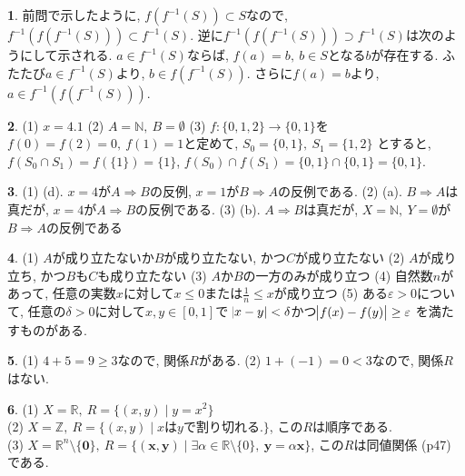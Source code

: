 \documentclass{amsart}
\theoremstyle{definition}
\newtheorem{ans}{}
\numberwithin{ans}{subsection}
\begin{document}
\begin{ans}
  前問で示したように, $f(f^{-1}(S)) \subset S$なので,
  $f^{-1}(f(f^{-1}(S))) \subset f^{-1}(S)$.
  逆に$f^{-1}(f(f^{-1}(S))) \supset f^{-1}(S)$は次のようにして示される.
  $a \in f^{-1}(S)$ならば, $f(a) = b,\ b \in S$となる$b$が存在する.
  ふたたび$a \in f^{-1}(S)$より, $b \in f(f^{-1}(S))$.
  さらに$f(a) = b$より, $a \in f^{-1}(f(f^{-1}(S)))$.
\end{ans}

\begin{ans}
  (1) $x = 4.1$
  (2) $A = \mathbb{N},\ B = \emptyset$
  (3) $f: \{0, 1, 2\} \rightarrow \{0, 1\}$を
  $f(0) = f(2) = 0,\ f(1) = 1$と定めて,
  $S_0 = \{0, 1\},\ S_1 = \{1, 2\}$
  とすると, $f(S_0 \cap S_1) = f(\{1\}) = \{1\}$,
  $f(S_0) \cap f(S_1) = \{0, 1\} \cap \{0, 1\} = \{0, 1\}$.
\end{ans}

\begin{ans}
  (1) (d).
  $x = 4$が$A \Rightarrow B$の反例,
  $x = 1$が$B \Rightarrow A$の反例である.
  (2) (a).
  $B \Rightarrow A$は真だが,
  $x = 4$が$A \Rightarrow B$の反例である.
  (3) (b). $A \Rightarrow B$は真だが,
  $X = \mathbb{N},\ Y = \emptyset$が$B \Rightarrow A$の反例である
\end{ans}

\begin{ans}
  (1) $A$が成り立たないか$B$が成り立たない, かつ$C$が成り立たない
  (2) $A$が成り立ち, かつ$B$も$C$も成り立たない
  (3) $A$か$B$の一方のみが成り立つ
  (4) 自然数$n$があって, 任意の実数$x$に対して$x \le 0$または$\frac{1}{n} \le x$が成り立つ
  (5) ある$\varepsilon > 0$について, 任意の$\delta > 0$に対して$x, y \in [0, 1]$で
  $\abs{x - y} < \delta$かつ$\abs{f(x) - f(y)} \ge \varepsilon$
  を満たすものがある.
\end{ans}

\begin{ans}
  (1) $4 + 5 = 9 \ge 3$なので, 関係$R$がある.
  (2) $1 + (-1) = 0 < 3$なので, 関係$R$はない.
\end{ans}

\begin{ans}
  (1) $X = \mathbb{R},\ R = \{(x, y) \mid y = x^2\}$\\
  (2) $X = \mathbb{Z},\ R = \{(x, y) \mid x\text{は}y\text{で割り切れる.}\}$,
  この$R$は順序である.\\
  (3) $X = \mathbb{R}^n\setminus\{\bm{0}\},\ R = \{(\bm{x}, \bm{y}) \mid \exists \alpha \in \mathbb{R}\setminus\{0\},\ \bm{y} = \alpha \bm{x} \}$,
  この$R$は同値関係 (p47) である.
\end{ans}
\end{document}
